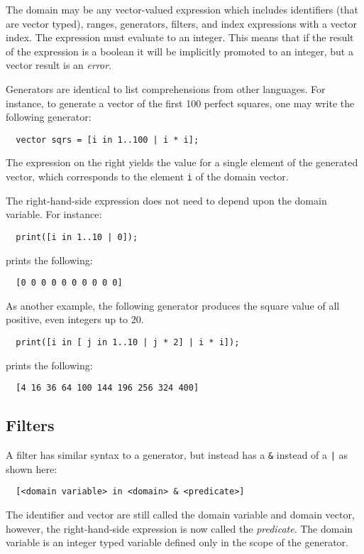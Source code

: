 \documentclass{article}
\newcommand{\code}[1]{\texttt{\textmd{#1}}}
\begin{document}
The domain may be any vector-valued expression which includes identifiers (that are vector typed),
ranges, generators, filters, and index expressions with a vector index. The expression must evaluate
to an integer. This means that if the result of the expression is a boolean it will be implicitly
promoted to an integer, but a vector result is an \textit{error}.

Generators are identical to list comprehensions from other languages. For instance, to generate a
vector of the first 100 perfect squares, one may write the following generator:
\begin{lstlisting}
  vector sqrs = [i in 1..100 | i * i];
\end{lstlisting}

The expression on the right yields the value for a single element of the generated vector, which
corresponds to the element \code{i} of the domain vector.

The right-hand-side expression does not need to depend upon the domain variable. For instance:
\begin{lstlisting}
  print([i in 1..10 | 0]);
\end{lstlisting}

prints the following:
\begin{lstlisting}
  [0 0 0 0 0 0 0 0 0 0]
\end{lstlisting}

As another example, the following generator produces the square value of all positive, even integers
up to 20.
\begin{lstlisting}
  print([i in [ j in 1..10 | j * 2] | i * i]);
\end{lstlisting}

prints the following:
\begin{lstlisting}
  [4 16 36 64 100 144 196 256 324 400]
\end{lstlisting}

\subsection{Filters}
A filter has similar syntax to a generator, but instead has a \code{\&} instead of a \code{|} as
shown here:
\begin{lstlisting}
  [<domain variable> in <domain> & <predicate>]
\end{lstlisting}
The identifier and vector are still called the domain variable and domain vector, however, the
right-hand-side expression is now called the \textit{predicate}. The domain variable is an integer
typed variable defined only in the scope of the generator.
\end{document}
